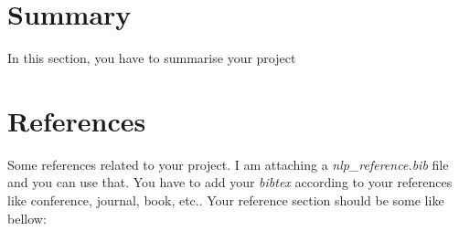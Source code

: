 \documentclass[11pt, oneside]{article}   	%
\begin{document}
\section{Summary}

In this section, you have to summarise your project

\section{References}

Some references related to your project. I am attaching a \textit{nlp\_reference.bib} file and you can use that. You have to add your \textit{bibtex} according to your references {like conference, journal, book, etc.}. Your reference section should be some like bellow:


\nocite{*}%
	

\end{document}
